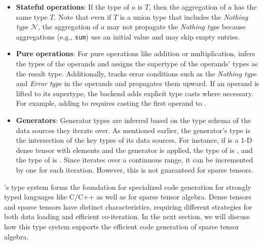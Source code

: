 \documentclass[acmsmall,nonacm]{acmart}\settopmatter{printfolios=true,printccs=false,printacmref=false}
\newcommand{\rhyme}{\text{Rhyme}\xspace}
\begin{document}
\begin{itemize} \item \textbf{Stateful operations}: If the type of $a$ is $T$, then the aggregation of $a$ has the same type $T$. Note that even if $T$ is a union type that includes the \emph{Nothing type} $\mathcal{N}$, the aggregation of $a$ may not propagate the \emph{Nothing type} because aggregations (e.g., \texttt{sum}) use an initial value and may skip empty entries.

\item \textbf{Pure operations}: For pure operations like addition or multiplication, \rhyme infers the types of the operands and assigns the supertype of the operands' types as the result type. Additionally, \rhyme tracks error conditions such as the \emph{Nothing type} and \emph{Error type} in the operands and propagates them upward. If an operand is lifted to its supertype, the backend adds explicit type casts where necessary. For example, adding  to  requires casting the first operand to .

\item \textbf{Generators}: Generator types are inferred based on the type schema of the data sources they iterate over. As mentioned earlier, the generator's type is the intersection of the key types of its data sources. For instance, if  is a 1-D dense tensor with  elements and the generator \inline{*} is applied, the type of \inline{*} is , and the type of  is . Since \inline{*} iterates over a continuous range, it can be incremented by one for each iteration. However, this is not guaranteed for sparse tensors. \end{itemize}\par

\rhyme's type system forms the foundation for specialized code generation for strongly typed languages like C/C++ as well as for sparse tensor algebra. Dense tensors and sparse tensors have distinct characteristics, requiring different strategies for both data loading and efficient co-iteration. In the next section, we will discuss how this type system supports the efficient code generation of sparse tensor algebra.
\end{document}
